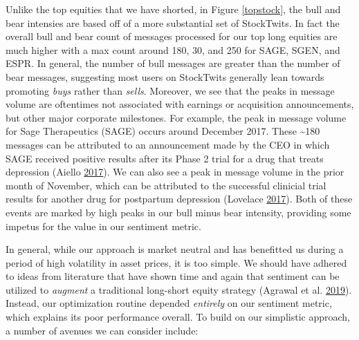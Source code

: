 \documentclass[11,]{article}
\begin{document}
Unlike the top equities that we have shorted, in Figure \ref{topstock},
the bull and bear intensies are based off of a more substantial set of
StockTwits. In fact the overall bull and bear count of messages
processed for our top long equities are much higher with a max count
around 180, 30, and 250 for SAGE, SGEN, and ESPR. In general, the number
of bull messages are greater than the number of bear messages,
suggesting most users on StockTwits generally lean towards promoting
\emph{buys} rather than \emph{sells}. Moreover, we see that the peaks in
message volume are oftentimes not associated with earnings or
acquisition announcements, but other major corporate milestones. For
example, the peak in message volume for Sage Therapeutics (SAGE) occurs
around December 2017. These \textasciitilde{}180 messages can be
attributed to an announcement made by the CEO in which SAGE received
positive results after its Phase 2 trial for a drug that treats
depression (Aiello \protect\hyperlink{ref-sage1}{2017}). We can also see
a peak in message volume in the prior month of November, which can be
attributed to the successful clinicial trial results for another drug
for postpartum depression (Lovelace
\protect\hyperlink{ref-sage2}{2017}). Both of these events are marked by
high peaks in our bull minus bear intensity, providing some impetus for
the value in our sentiment metric.

In general, while our approach is market neutral and has benefitted us
during a period of high volatility in asset prices, it is too simple. We
should have adhered to ideas from literature that have shown time and
again that sentiment can be utilized to \emph{augment} a traditional
long-short equity strategy (Agrawal et al.
\protect\hyperlink{ref-agrawal2019}{2019}). Instead, our optimization
routine depended \emph{entirely} on our sentiment metric, which explains
its poor performance overall. To build on our simplistic approach, a
number of avenues we can consider include:
\end{document}
